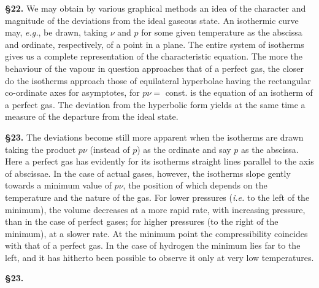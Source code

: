 \documentclass[oneside,12pt]{book}
\begin{document}
\textbf{\S 22.} We may obtain by various graphical methods an idea of the character and magnitude of the deviations from the ideal gaseous state. An isothermic curve may, \textit{e.g.}, be drawn, taking $\nu$ and $p$ for some given temperature as the abscissa and ordinate, respectively, of a point in a plane. The entire system of isotherms gives us a complete representation of the characteristic equation. The more the behaviour of the vapour in question approaches that of a perfect gas, the closer do the isotherms approach those of equilateral hyperbolae having the rectangular co-ordinate axes for asymptotes, for $p\nu=$ const. is the equation of an isotherm of a perfect gas. The deviation from the hyperbolic form yields at the same time a measure of the departure from the ideal state. \par 

\textbf{\S 23.} The deviations become still more apparent when the isotherms are drawn taking the product $p\nu$ (instead of $p$) as the ordinate and say $p$ as the abscissa. Here a perfect gas has evidently for its isotherms straight lines parallel to the axis of abscissae. In the case of actual gases, however, the isotherms slope gently towards a minimum value of $p\nu$, the position of which depends on the temperature and the nature of the gas. For lower pressures (\textit{i.e.} to the left of the minimum), the volume decreases at a more rapid rate, with increasing pressure, than in the case of perfect gases; for higher pressures (to the right of the minimum), at a slower rate. At the minimum point the compressibility coincides with that of a perfect gas. In the case of hydrogen the minimum lies far to the left, and it has hitherto been possible to observe it only at very low temperatures. \par 
\textbf{\S 23.}
\end{document}
